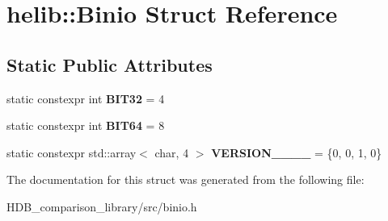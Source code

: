 \hypertarget{structhelib_1_1Binio}{}\section{helib\+:\+:Binio Struct Reference}
\label{structhelib_1_1Binio}
\subsection*{Static Public Attributes}
\begin{DoxyCompactItemize}
\item 
\mbox{\label{structhelib_1_1Binio_ad5a20f20b707150012f586f2fb7a156e}} 
static constexpr int {\bfseries B\+I\+T32} = 4
\item 
\mbox{\label{structhelib_1_1Binio_a7a5f07cafd1aee3ee6295085fa96888f}} 
static constexpr int {\bfseries B\+I\+T64} = 8
\item 
\mbox{\label{structhelib_1_1Binio_a0b359ad6907008d0ac3401365deda23e}} 
static constexpr std\+::array$<$ char, 4 $>$ {\bfseries V\+E\+R\+S\+I\+O\+N\+\_\+\_\+\_\+\_} = \{0, 0, 1, 0\}
\end{DoxyCompactItemize}


The documentation for this struct was generated from the following file\+:\begin{DoxyCompactItemize}
\item 
H\+D\+B\+\_\+comparison\+\_\+library/src/binio.\+h\end{DoxyCompactItemize}
